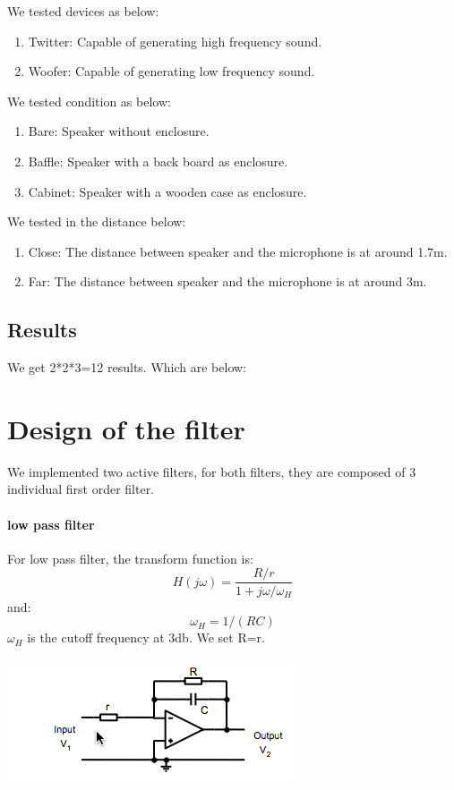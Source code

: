 \documentclass[11pt]{scrartcl}
\begin{document}
We tested devices as below:
\begin{enumerate}
  \item Twitter: Capable of generating high frequency sound.
  \item Woofer: Capable of generating low frequency sound.
\end{enumerate}

We tested condition as below:
\begin{enumerate}
  \item Bare: Speaker without enclosure.
  \item Baffle: Speaker with a back board as enclosure.
  \item Cabinet: Speaker with a wooden case as enclosure.
\end{enumerate}

We tested in the distance below:
\begin{enumerate}
  \item Close: The distance between speaker and the microphone is at around 1.7m.
  \item Far: The distance between speaker and the microphone is at around 3m.
\end{enumerate}
\subsection{Results}
We get 2*2*3=12 results. Which are below:


\section{Design of the filter}

We implemented two active filters, for both filters, they are composed of 3 individual first order filter. 
\paragraph{low pass filter}
For low pass filter, the transform function is:
$$H(j\omega) = \frac{R/r}{1+j\omega/\omega_H}$$
and:
$$\omega_H=1/(RC)$$
$\omega_H$ is the cutoff frequency at 3db. We set R=r.
\begin{center}
\begin{minipage}[t]{\linewidth}

{
\includegraphics[scale = 1]{low.png}
}
\end{minipage}
\medskip
\end{center}
\end{document}
